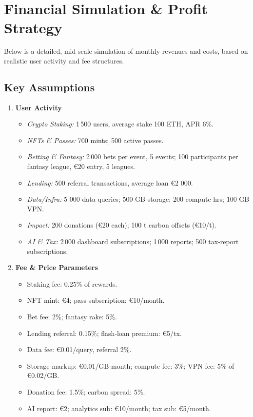 \documentclass[13pt]{extarticle}
\begin{document}
\newpage
\section{Financial Simulation \& Profit Strategy}

Below is a detailed, mid-scale simulation of monthly revenues and costs, based on realistic user activity and fee structures.

\subsection{Key Assumptions}
\begin{enumerate}[left=1em]
  \item \textbf{User Activity}
    \begin{itemize}[left=1.2em]
      \item \emph{Crypto Staking:} 1\,500 users, average stake 100 ETH, APR 6\%.
      \item \emph{NFTs \& Passes:} 700 mints; 500 active passes.
      \item \emph{Betting \& Fantasy:} 2\,000 bets per event, 5 events; 100 participants per fantasy league, €20 entry, 5 leagues.
      \item \emph{Lending:} 500 referral transactions, average loan €2 000.
      \item \emph{Data/Infra:} 5 000 data queries; 500 GB storage; 200 compute hrs; 100 GB VPN.
      \item \emph{Impact:} 200 donations (€20 each); 100 t carbon offsets (€10/t).
      \item \emph{AI \& Tax:} 2\,000 dashboard subscriptions; 1\,000 reports; 500 tax‐report subscriptions.
    \end{itemize}
  \item \textbf{Fee \& Price Parameters}
    \begin{itemize}[left=1.2em]
      \item Staking fee: 0.25\% of rewards.
      \item NFT mint: €4; pass subscription: €10/month.
      \item Bet fee: 2\%; fantasy rake: 5\%.
      \item Lending referral: 0.15\%; flash‐loan premium: €5/tx.
      \item Data fee: €0.01/query, referral 2\%.
      \item Storage markup: €0.01/GB-month; compute fee: 3\%; VPN fee: 5\% of €0.02/GB.
      \item Donation fee: 1.5\%; carbon spread: 5\%.
      \item AI report: €2; analytics sub: €10/month; tax sub: €5/month.
    \end{itemize}
\end{enumerate}
\end{document}
